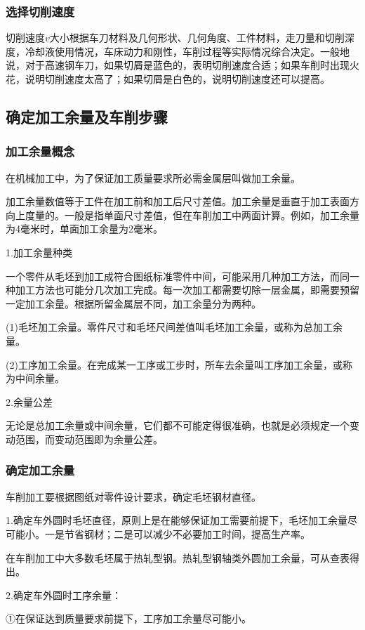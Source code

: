 \documentclass{ctexbook}
\begin{document}
\subsubsection{选择切削速度}
切削速度$v$大小根据车刀材料及几何形状、几何角度、工件材料，走刀量和切削深度，冷却液使用情况，车床动力和刚性，车削过程等实际情况综合决定。一般地说，对于高速钢车刀，如果切屑是蓝色的，表明切削速度合适；如果车削时出现火花，说明切削速度太高了；如果切屑是白色的，说明切削速度还可以提高。
\subsection{确定加工余量及车削步骤}
\subsubsection{加工余量概念}
在机械加工中，为了保证加工质量要求所必需金属层叫做加工余量。

加工余量数值等于工件在加工前和加工后尺寸差值。加工余量是垂直于加工表面方向上度量的。一般是指单面尺寸差值，但在车削加工中两面计算。例如，加工余量为4毫米时，单面加工余量为2毫米。

1.加工余量种类

一个零件从毛坯到加工成符合图纸标准零件中间，可能采用几种加工方法，而同一种加工方法也可能分几次加工完成。每一次加工都需要切除一层金属，即需要预留一定加工余量。根据所留金属层不同，加工余量分为两种。

(1)毛坯加工余量。零件尺寸和毛坯尺间差值叫毛坯加工余量，或称为总加工余量。

(2)工序加工余量。在完成某一工序或工步时，所车去余量叫工序加工余量，或称为中间余量。

2.余量公差

无论是总加工余量或中间余量，它们都不可能定得很准确，也就是必须规定一个变动范围，而变动范围即为余量公差。
\subsubsection{确定加工余量}
车削加工要根据图纸对零件设计要求，确定毛坯钢材直径。

1.确定车外圆时毛坯直径，原则上是在能够保证加工需要前提下，毛坯加工余量尽可能小。一是节省钢材；二是可以减少不必要加工时间，提高生产率。

在车削加工中大多数毛坯属于热轧型钢。热轧型钢轴类外圆加工余量，可从查表得出。

2.确定车外圆时工序余量：

①在保证达到质量要求前提下，工序加工余量尽可能小。
\end{document}
